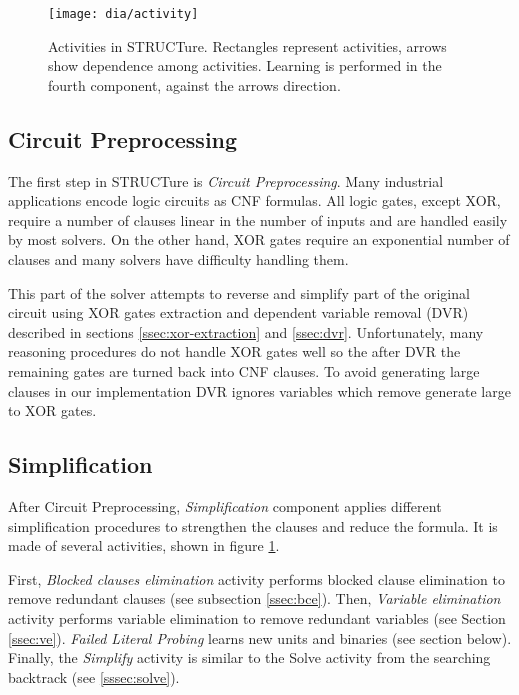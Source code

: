 \begin{figure}
  \centering
  \texttt{[image: dia/activity]}
  \caption{Activities in STRUCTure. Rectangles represent activities,
  arrows show dependence among activities. Learning is
  performed in the fourth component, against the arrows direction.}
  \label{fig:activities}
\end{figure}


\subsection{Circuit Preprocessing}

The first step in STRUCTure is \emph{Circuit Preprocessing}. Many
industrial applications encode logic circuits as CNF formulas.
All logic gates, except XOR, require a number of clauses linear in the number
of inputs and are handled easily by most solvers. On the other hand,
XOR gates require an exponential number of clauses and many solvers
have difficulty handling them.

This part of the solver attempts to reverse and simplify part of the
original circuit using XOR gates extraction and dependent variable
removal (DVR) described in sections \ref{ssec:xor-extraction}
and \ref{ssec:dvr}.  Unfortunately, many reasoning procedures do
not handle XOR gates well so the after DVR the remaining gates are
turned back into CNF clauses. To avoid generating large clauses in
our implementation DVR ignores variables which remove
generate large to XOR gates.


\subsection{Simplification}

After Circuit Preprocessing, \emph{Simplification} component applies
different simplification procedures to strengthen the clauses and
reduce the formula. It is made of several activities, shown in
figure \ref{fig:activities}.

First, \emph{Blocked clauses elimination} activity performs blocked
clause elimination to remove redundant clauses (see subsection
\ref{ssec:bce}). Then, \emph{Variable elimination} activity performs
variable elimination to remove redundant variables (see Section
\ref{ssec:ve}). \emph{Failed Literal Probing} learns new units
and binaries (see section below).  Finally, the \emph{Simplify}
activity is similar to the Solve activity from the searching
backtrack (see \ref{sssec:solve}).

